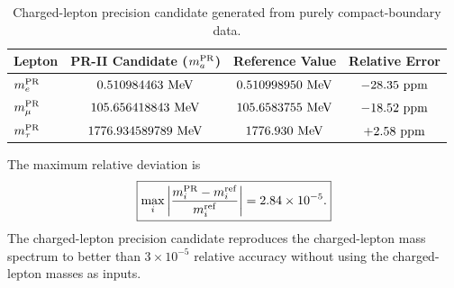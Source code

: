 \documentclass[11pt]{article}
\renewcommand{\arraystretch}{1.22}
\renewcommand{\arraystretch}{1.4}
\begin{document}
\begin{table}[ht!]
\centering
\caption{Charged-lepton precision candidate generated from purely compact-boundary data.}
\label{tab:pr2_charged_lepton_precision_candidate_main}
\small
\renewcommand{\arraystretch}{1.25}
\begin{tabular}{lccc}
\hline\hline
\textbf{Lepton} & \textbf{PR-II Candidate} (\(m_a^{\rm PR}\)) & \textbf{Reference Value} & \textbf{Relative Error} \\ \hline
\(m_e^{\rm PR}\) 
& \(0.510984463\ {\rm MeV}\) 
& \(0.510998950\ {\rm MeV}\) 
& \(-28.35\ {\rm ppm}\) \\

\(m_\mu^{\rm PR}\) 
& \(105.656418843\ {\rm MeV}\) 
& \(105.6583755\ {\rm MeV}\) 
& \(-18.52\ {\rm ppm}\) \\

\(m_\tau^{\rm PR}\) 
& \(1776.934589789\ {\rm MeV}\) 
& \(1776.930\ {\rm MeV}\) 
& \(+2.58\ {\rm ppm}\) \\ \hline\hline
\end{tabular}
\end{table}

The maximum relative deviation is
\begin{equation}
\boxed{
\max_i
\left|
\frac{
m_i^{\rm PR}-m_i^{\rm ref}
}{
m_i^{\rm ref}
}
\right|
=
2.84\times10^{-5}.
}
\end{equation}
The charged-lepton precision candidate reproduces the charged-lepton mass spectrum to better than \(3\times10^{-5}\) relative accuracy without using the charged-lepton masses as inputs.
\end{document}
